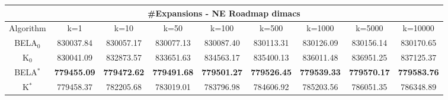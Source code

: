 \begin{tabular}{c|cccccccc}\toprule
\multicolumn{9}{c}{#Expansions - NE Roadmap dimacs}\\ \midrule
Algorithm & k=1 & k=10 & k=50 & k=100 & k=500 & k=1000 & k=5000 & k=10000 \\ \midrule
BELA$_0$ & 830037.84 & 830057.17 & 830077.13 & 830087.40 & 830113.31 & 830126.09 & 830156.14 & 830170.65 \\
K$_0$ & 830041.09 & 832873.57 & 833651.63 & 834563.17 & 835400.13 & 836011.48 & 836951.25 & 837125.37 \\
BELA$^*$ & \textbf{779455.09} & \textbf{779472.62} & \textbf{779491.68} & \textbf{779501.27} & \textbf{779526.45} & \textbf{779539.33} & \textbf{779570.17} & \textbf{779583.76} \\
K$^*$ & 779458.37 & 782205.68 & 783019.01 & 783796.98 & 784606.92 & 785203.56 & 786051.35 & 786348.89 \\ \bottomrule 
\end{tabular}
